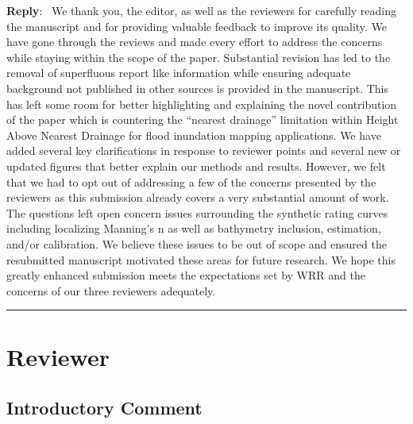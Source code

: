 \documentclass[11pt]{article}
\newcounter{reviewer}
\newcounter{point}[reviewer]
\newcommand{\reviewersection}{\stepcounter{reviewer} \bigskip \hrule
                  \section*{Reviewer \thereviewer}}
\newenvironment{reply}
   {\medskip \noindent \begin{sf}\textbf{Reply}:\  }
   {\medskip \end{sf}}
\begin{document}
\begin{reply}
We thank you, the editor, as well as the reviewers for carefully reading the manuscript and for providing valuable feedback to improve its quality.
We have gone through the reviews and made every effort to address the concerns while staying within the scope of the paper.
Substantial revision has led to the removal of superfluous report like information while ensuring adequate background not published in other sources is provided in the manuscript.
This has left some room for better highlighting and explaining the novel contribution of the paper which is countering the ``nearest drainage'' limitation within Height Above Nearest Drainage for flood inundation mapping applications.
We have added several key clarifications in response to reviewer points and several new or updated figures that better explain our methods and results.
However, we felt that we had to opt out of addressing a few of the concerns presented by the reviewers as this submission already covers a very substantial amount of work.
The questions left open concern issues surrounding the synthetic rating curves including localizing Manning's n as well as bathymetry inclusion, estimation, and/or calibration.
We believe these issues to be out of scope and ensured the resubmitted manuscript motivated these areas for future research. 
We hope this greatly enhanced submission meets the expectations set by WRR and the concerns of our three reviewers adequately.
\end{reply}

\clearpage
\reviewersection

\subsection*{Introductory Comment}
\end{document}
